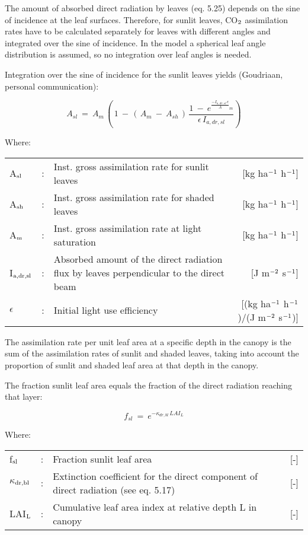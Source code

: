 The amount of absorbed direct radiation by leaves (eq. 5.25) depends on the sine of
incidence at the leaf surfaces. Therefore, for sunlit leaves, CO$_{{\rm 2}}$ assimilation rates have to
be calculated separately for leaves with different angles and integrated over the sine of
incidence. In the model a spherical leaf angle distribution is assumed, so no integration
over leaf angles is needed.

Integration over the sine of incidence for the sunlit leaves yields (Goudriaan, personal
communication):

\begin{equation}
A _{sl} ~=~ A _{m} \, (\, 1~-\, (\, A _{m} ~-~A _{sh} \, )\, {{\frac{ 1~-~e ^{{\frac{{{-I _{a,dr,sl} \, \epsilon }}}{A}} _{m} } }{\epsilon\, I _{a,dr,sl} }} })
\end{equation}

Where:\\
\begin{tabularx}{\textwidth}{llXr}
A$_{{\rm sl}}$ &:& Inst. gross assimilation rate for sunlit leaves  &    [kg ha$^{{\rm -1}}$ h$^{{\rm -1}}$]\\
A$_{{\rm sh}}$ &:& Inst. gross assimilation rate for shaded leaves  &    [kg ha$^{{\rm -1}}$ h$^{{\rm -1}}$]\\
A$_{{\rm m}}$ &:& Inst. gross assimilation rate at light saturation &    [kg ha$^{{\rm -1}}$ h$^{{\rm -1}}$]\\
I$_{{\rm a,dr,sl}}$ &:& Absorbed amount of the direct radiation flux by leaves
   perpendicular to the direct beam  &  [J m$^{{\rm -2}}$ s$^{{\rm -1}}$]\\
$\epsilon$ &:& Initial light use efficiency  &   [(kg ha$^{{\rm -1}}$ h$^{{\rm -1}}$)/(J m$^{{\rm -2}}$ s$^{{\rm -1}}$)]\\
\end{tabularx}

The assimilation rate per unit leaf area at a specific depth in the canopy is the sum of the
assimilation rates of sunlit and shaded leaves, taking into account the proportion of sunlit
and shaded leaf area at that depth in the canopy. 

The fraction sunlit leaf area equals the fraction of the direct radiation reaching that layer:

\begin{equation}
f _{sl} ~=~  e ^{-\kappa _{dr,bl} \, LAI _{L} }
\end{equation}

 
Where:\\
\begin{tabularx}{\textwidth}{llXr}
f$_{{\rm sl}}$ &:& Fraction sunlit leaf area   &     [-]\\
$\kappa$$_{{\rm dr,bl}}$ &:& Extinction coefficient for the direct component of
   direct radiation (see eq. 5.17)   &     [-]\\
LAI$_{{\rm L}}$ &:& Cumulative leaf area index at relative depth L in canopy  &      [-]
\end{tabularx}


